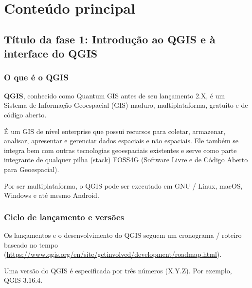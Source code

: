 \documentclass[
]{book}
\begin{document}
\hypertarget{conteuxfado-principal-1}{%
\section{Conteúdo principal}\label{conteuxfado-principal-1}}

\hypertarget{tuxedtulo-da-fase-1-introduuxe7uxe3o-ao-qgis-e-uxe0-interface-do-qgis}{%
\subsection{Título da fase 1: Introdução ao QGIS e à interface do QGIS}\label{tuxedtulo-da-fase-1-introduuxe7uxe3o-ao-qgis-e-uxe0-interface-do-qgis}}

\hypertarget{o-que-uxe9-o-qgis}{%
\subsubsection{\texorpdfstring{\textbf{O que é o QGIS}}{O que é o QGIS}}\label{o-que-uxe9-o-qgis}}

\textbf{QGIS}, conhecido como Quantum GIS antes de seu lançamento 2.X, é um Sistema de Informação Geoespacial (GIS) maduro, multiplataforma, gratuito e de código aberto.

É um GIS de nível enterprise que possui recursos para coletar, armazenar, analisar, apresentar e gerenciar dados espaciais e não espaciais. Ele também se integra bem com outras tecnologias geoespaciais existentes e serve como parte integrante de qualquer pilha (stack) FOSS4G (Software Livre e de Código Aberto para Geoespacial).

Por ser multiplataforma, o QGIS pode ser executado em GNU / Linux, macOS, Windows e até mesmo Android.

\hypertarget{ciclo-de-lanuxe7amento-e-versuxf5es}{%
\subsubsection{\texorpdfstring{\textbf{Ciclo de lançamento e versões}}{Ciclo de lançamento e versões}}\label{ciclo-de-lanuxe7amento-e-versuxf5es}}

Os lançamentos e o desenvolvimento do QGIS seguem um cronograma / roteiro baseado no tempo (\href{https://www.qgis.org/en/site/\%20getinvolved\%20/\%20development\%20/\%20roadmap.html}{https://www.qgis.org/en/site/getinvolved/development/roadmap.html}).

Uma versão do QGIS é especificada por três números (X.Y.Z). Por exemplo, QGIS 3.16.4.
\end{document}
